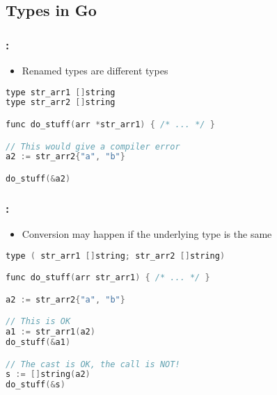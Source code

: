 \subsection{Types in Go}

\begin{frame}[fragile]
    \frametitle{\secname: \small\subsecname\normalsize}

    \begin{itemize}
        \item Renamed types are different types
    \end{itemize}

    \small \begin{lstlisting}[language=c]
type str_arr1 []string
type str_arr2 []string

func do_stuff(arr *str_arr1) { /* ... */ }

// This would give a compiler error
a2 := str_arr2{"a", "b"}

do_stuff(&a2)
    \end{lstlisting} \normalsize
\end{frame}

\begin{frame}[fragile]
    \frametitle{\secname: \small\subsecname\normalsize}

    \begin{itemize}
        \item Conversion may happen if the underlying type is the same
    \end{itemize}

    \small \begin{lstlisting}[language=c]
type ( str_arr1 []string; str_arr2 []string)

func do_stuff(arr str_arr1) { /* ... */ }

a2 := str_arr2{"a", "b"}

// This is OK
a1 := str_arr1(a2)
do_stuff(&a1)

// The cast is OK, the call is NOT!
s := []string(a2)
do_stuff(&s)
    \end{lstlisting} \normalsize
\end{frame}

